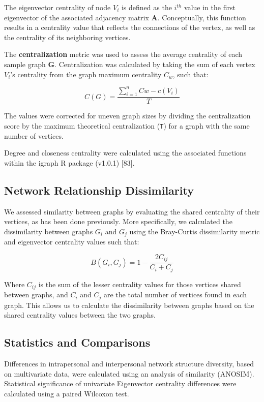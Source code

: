 \documentclass[12pt,]{article}
\begin{document}
The eigenvector centrality of node \(V_i\) is defined as the \(i^{th}\)
value in the first eigenvector of the associated adjacency matrix
\(\mathbf{A}\). Conceptually, this function results in a centrality
value that reflects the connections of the vertex, as well as the
centrality of its neighboring vertices.

The \textbf{centralization} metric was used to assess the average
centrality of each sample graph \(\mathbf{G}\). Centralization was
calculated by taking the sum of each vertex \(V_{i}\)'s centrality from
the graph maximum centrality \(C_{w}\), such that:

\[ C\left( G \right) =\frac { \sum _{ i=1 }^{ n }{ Cw -c\left( { V }_{ i } \right)  }  }{ { T } }  \]

The values were corrected for uneven graph sizes by dividing the
centralization score by the maximum theoretical centralization
(\texttt{T}) for a graph with the same number of vertices.

Degree and closeness centrality were calculated using the associated
functions within the igraph R package (v1.0.1) {[}83{]}.

\subsection{Network Relationship
Dissimilarity}\label{network-relationship-dissimilarity}

We assessed similarity between graphs by evaluating the shared
centrality of their vertices, as has been done previously. More
specifically, we calculated the dissimilarity between graphs \(G_{i}\)
and \(G_{j}\) using the Bray-Curtis dissimilarity metric and eigenvector
centrality values such that:

\[ B\left( { G }_{ i },{ G }_{ j } \right) =1-\frac { 2{ C }_{ ij } }{ { C }_{ i }+{ C }_{ j } } \]

Where \(C_{ij}\) is the sum of the lesser centrality values for those
vertices shared between graphs, and \(C_{i}\) and \(C_{j}\) are the
total number of vertices found in each graph. This allows us to
calculate the dissimilarity between graphs based on the shared
centrality values between the two graphs.

\subsection{Statistics and
Comparisons}\label{statistics-and-comparisons}

Differences in intrapersonal and interpersonal network structure
diversity, based on multivariate data, were calculated using an analysis
of similarity (ANOSIM). Statistical significance of univariate
Eigenvector centrality differences were calculated using a paired
Wilcoxon test.
\end{document}
